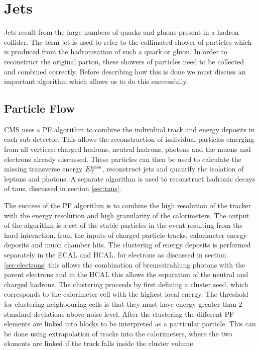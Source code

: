 \section{Jets}
\label{sec:jets}

Jets result from the large numbers of quarks and gluons present in a hadron
collider. The term jet is used to refer to the collimated shower of particles
which is produced from the hadronisation of such a quark or gluon. In order to
reconstruct the original parton, these showers of particles need to be collected
and combined correctly. Before describing how this is done we must discuss an
important algorithm which allows us to do this successfully. 

\subsection{Particle Flow}
\label{sec:particleflow}

CMS uses a \ac{PF} \cite{CMS-PAS-PFT-09-001,CMS-PAS-PFT-10-001,CMS-PAS-PFT-10-002} 
algorithm to combine the individual track and energy deposits in each sub-detector. 
This allows the reconstruction of individual particles emerging from all vertices: charged
hadrons, neutral hadrons, photons and the muons and electrons already discussed.
These particles can then be 
used to calculate the missing transverse energy $E_{\mathrm{T}}^{\text{miss}}$,
reconstruct jets and quantify the isolation of leptons and photons. A separate
algorithm is used to reconstruct hadronic decays of taus, discussed in section
\ref{sec:taus}. 

The success of the \ac{PF} algorithm is to combine the high resolution of
the tracker with the energy resolution and high granularity of the calorimeters.
The output of the algorithm is a set of the stable particles in the event
resulting from the hard interaction, from the inputs of charged particle tracks,
calorimeter energy deposits and muon chamber hits. The clustering of energy
deposits is performed separately in the \ac{ECAL} and \ac{HCAL}, for electrons
as discussed in section \ref{sec:electrons} this allows the combination of
bremsstrahlung photons with the parent electrons and in the \ac{HCAL} this
allows the separation of the neutral and charged hadrons. The clustering
proceeds by first defining a cluster seed, which corresponds to the calorimeter
cell with the highest local energy. The threshold for clustering neighbouring
cells is that they must have energy greater than 2 standard deviations above
noise level. After the clustering the different \ac{PF} elements are linked into
blocks to be interpreted as a particular particle. This can be done using
extrapolation of tracks into the calorimeters, where the two elements are linked
if the track falls inside the cluster volume.

